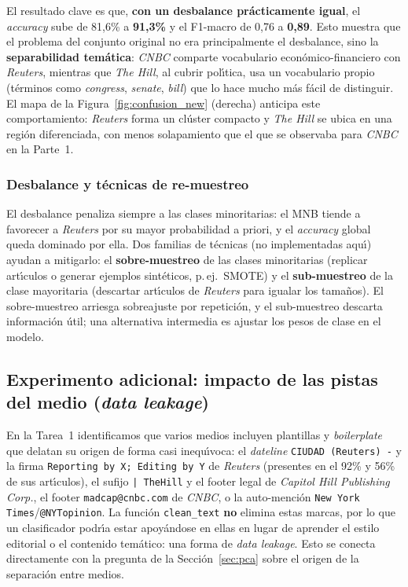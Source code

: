 \documentclass[11pt,a4paper]{article}
\begin{document}
El resultado clave es que, \textbf{con un desbalance pr\'{a}cticamente igual}, el \textit{accuracy} sube de 81,6\% a \textbf{91,3\%} y el F1-macro de 0,76 a \textbf{0,89}. Esto muestra que el problema del conjunto original no era principalmente el desbalance, sino la \textbf{separabilidad tem\'{a}tica}: \textit{CNBC} comparte vocabulario econ\'{o}mico-financiero con \textit{Reuters}, mientras que \textit{The Hill}, al cubrir pol\'{\i}tica, usa un vocabulario propio (t\'{e}rminos como \textit{congress}, \textit{senate}, \textit{bill}) que lo hace mucho m\'{a}s f\'{a}cil de distinguir. El mapa de la Figura~\ref{fig:confusion_new} (derecha) anticipa este comportamiento: \textit{Reuters} forma un cl\'{u}ster compacto y \textit{The Hill} se ubica en una regi\'{o}n diferenciada, con menos solapamiento que el que se observaba para \textit{CNBC} en la Parte~1.

\subsubsection*{Desbalance y t\'{e}cnicas de re-muestreo}

El desbalance penaliza siempre a las clases minoritarias: el MNB tiende a favorecer a \textit{Reuters} por su mayor probabilidad a priori, y el \textit{accuracy} global queda dominado por ella. Dos familias de t\'{e}cnicas (no implementadas aqu\'{\i}) ayudan a mitigarlo: el \textbf{sobre-muestreo} de las clases minoritarias (replicar art\'{\i}culos o generar ejemplos sint\'{e}ticos, p.\,ej.\ SMOTE) y el \textbf{sub-muestreo} de la clase mayoritaria (descartar art\'{\i}culos de \textit{Reuters} para igualar los tama\~{n}os). El sobre-muestreo arriesga sobreajuste por repetici\'{o}n, y el sub-muestreo descarta informaci\'{o}n \'{u}til; una alternativa intermedia es ajustar los pesos de clase en el modelo.

\subsection{Experimento adicional: impacto de las pistas del medio (\textit{data leakage})}
\label{sec:pistas}

En la Tarea~1 identificamos que varios medios incluyen plantillas y \textit{boilerplate} que delatan su origen de forma casi inequ\'{\i}voca: el \textit{dateline} \texttt{CIUDAD (Reuters) -} y la firma \texttt{Reporting by X; Editing by Y} de \textit{Reuters} (presentes en el 92\% y 56\% de sus art\'{\i}culos), el sufijo \texttt{| TheHill} y el footer legal de \textit{Capitol Hill Publishing Corp.}, el footer \texttt{madcap@cnbc.com} de \textit{CNBC}, o la auto-menci\'{o}n \texttt{New York Times}/\texttt{@NYTopinion}. La funci\'{o}n \texttt{clean\_text} \textbf{no} elimina estas marcas, por lo que un clasificador podr\'{\i}a estar apoy\'{a}ndose en ellas en lugar de aprender el estilo editorial o el contenido tem\'{a}tico: una forma de \textit{data leakage}. Esto se conecta directamente con la pregunta de la Secci\'{o}n~\ref{sec:pca} sobre el origen de la separaci\'{o}n entre medios.
\end{document}
